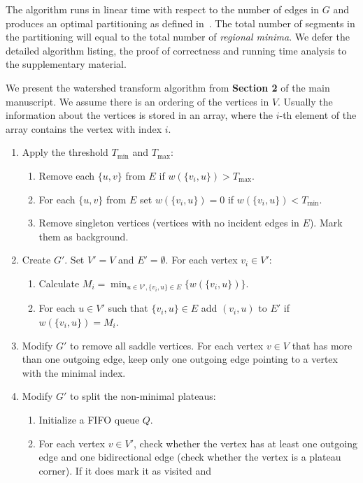 \documentclass[10pt, conference, compsocconf]{IEEEtran}
\begin{document}
 The algorithm runs in linear time with respect to the number of edges
 in $G$ and produces an optimal partitioning as defined
 in~\cite{Cousty2009}. The total number of segments in the
 partitioning will equal to the total number of \emph{regional
   minima}. We defer the detailed algorithm listing, the proof of
 correctness and running time analysis to the supplementary material.


 We present the watershed transform algorithm from {\bf Section 2} of
 the main manuscript. We assume there is an ordering of the vertices
 in $V$. Usually the information about the vertices is stored in an
 array, where the $i$-th element of the array contains the vertex with
 index $i$.

\begin{enumerate}
\item Apply the threshold $T_{\min}$ and $T_{\max}$:
  \begin{enumerate}
  \item Remove each $\{u,v\}$ from $E$ if $w(\{v_i,u\}) > T_{\max}$.
  \item For each $\{u,v\}$ from $E$ set $w(\{v_i,u\}) = 0$ if
    $w(\{v_i,u\}) < T_{\min}$.
  \item Remove singleton vertices (vertices with no incident edges in
    $E$). Mark them as background.
  \end{enumerate}
\item Create $G'$. Set $V'=V$ and $E'=\emptyset$. For each vertex $v_i
  \in V'$:
  \begin{enumerate}
  \item Calculate $M_i = \min_{u \in V', \{v_i,u\} \in
    E}\{w(\{v_i,u\})\}$.
  \item For each $u \in V'$ such that $\{v_i,u\} \in E$ add $(v_i,u)$
    to $E'$ if $w(\{v_i,u\})=M_i$.
  \end{enumerate}
\item Modify $G'$ to remove all saddle vertices. For each vertex $v
  \in V$ that has more than one outgoing edge, keep only one outgoing
  edge pointing to a vertex with the minimal index.
\item Modify $G'$ to split the non-minimal plateaus:
  \begin{enumerate}
  \item Initialize a FIFO queue $Q$.
  \item For each vertex $v \in V'$, check whether the vertex has at
    least one outgoing edge and one bidirectional edge (check whether
    the vertex is a plateau corner). If it does mark it as visited and

\end{enumerate}
\end{enumerate}
\end{document}
